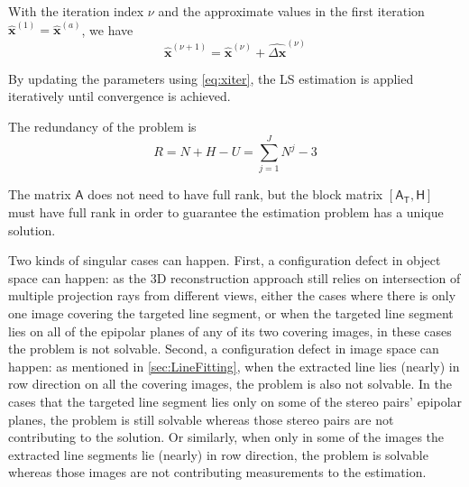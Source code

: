 With the iteration index $\nu$ and the approximate values in the first iteration $\widehat{\boldsymbol x}^{(1)}=\widehat{\boldsymbol x}^{(a)}$, we have
\begin{equation}\label{eq:xiter}
	\widehat{\boldsymbol x}^{(\nu+1)}=
	\widehat{\boldsymbol x}^{(\nu)}+
	\widehat{\Delta\boldsymbol x}^{(\nu)}
\end{equation}

By updating the parameters using \cref{eq:xiter}, the LS estimation is applied iteratively until convergence is achieved. 


The redundancy of the problem is
\begin{equation}
R=N+H-U=\displaystyle\sum_{j=1}^{J}N^j-3
\end{equation}

The matrix $\mathsf{A}$ does not need to have full rank, but the block matrix $[\mathsf{A_T},\mathsf{H}]$ must have full rank in order to guarantee the estimation problem has a unique solution.


\clearpage
Two kinds of singular cases can happen. First, a configuration defect in object space can happen: as the 3D reconstruction approach still relies on intersection of multiple projection rays from different views, either the cases where there is only one image covering the targeted line segment, or when the targeted line segment lies on all of the epipolar planes of any of its two covering images, in these cases the problem is not solvable. Second, a configuration defect in image space can happen: as mentioned in \cref{sec:LineFitting}, when the extracted line lies (nearly) in row direction on all the covering images, the problem is also not solvable. In the cases that the targeted line segment lies only on some of the stereo pairs' epipolar planes, the problem is still solvable whereas those stereo pairs are not contributing to the solution. Or similarly, when only in some of the images the extracted line segments lie (nearly) in row direction, the problem is solvable whereas those images are not contributing measurements to the estimation.




